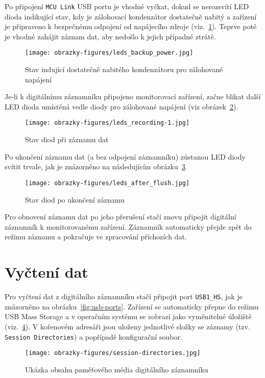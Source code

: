 Po připojení \texttt{MCU Link} USB portu je vhodné vyčkat, dokud se nerozsvítí LED dioda indikující stav, kdy je zálohovací kondenzátor dostatečně nabitý a zařízení je připraveno k bezpečnému odpojení od napájecího zdroje (viz.~\ref{fig:leds-backup-power}). Teprve poté je vhodné zahájit záznam dat, aby nedošlo k jejich případné ztrátě.

\begin{figure}[h]
    \centering
    \texttt{[image: obrazky-figures/leds\_backup\_power.jpg]}
    
    \caption{Stav indující dostatečně nabitého kondenzátoru pro zálohované napájení}
    \label{fig:leds-backup-power}
\end{figure}

Je-li k digitálnímu záznamníku připojeno monitorovací zařízení, začne blikat další LED dioda umístěná vedle diody pro zálohované napájení (viz obrázek~\ref{fig:leds-recording}). 

\begin{figure}[h]
    \centering
    \texttt{[image: obrazky-figures/leds\_recording-1.jpg]}
    
    \caption{Stav diod při záznamu dat}
    \label{fig:leds-recording}
\end{figure}

\newpage

Po ukončení záznamu dat (a bez odpojení záznamníku) zůstanou LED diody svítit trvale, jak je znázorněno na následujícím obrázku~\ref{fig:leds-after-flush}.

\begin{figure}[h]
    \centering
    \texttt{[image: obrazky-figures/leds\_after\_flush.jpg]}
    
    \caption{Stav diod po ukončení záznamu}
    \label{fig:leds-after-flush}
\end{figure}

Pro obnovení záznamu dat po jeho přerušení stačí znovu připojit digitální záznamník k monitorovanému zařízení. Záznamník automaticky přejde zpět do režimu záznamu a pokračuje ve zpracování příchozích dat.

\section{Vyčtení dat}
Pro vyčtení dat z digitálního záznamníku stačí připojit port \texttt{USB1\_HS}, jak je znázorněno na obrázku~\ref{fig:usb-ports}. Zařízení se automaticky přepne do režimu USB Mass Storage a v operačním systému se zobrazí jako vyměnitelné úložiště (viz.~\ref{fig:datalogger-medium}). V kořenovém adresáři jsou uloženy jednotlivé složky se záznamy (tzv. \texttt{Session Directories}) a popřípadě konfigurační soubor.

\begin{figure}[h]
    \centering
    \texttt{[image: obrazky-figures/session-directories.jpg]}
    
    \caption{Ukázka obsahu paměťového média digitálního záznamníku}
    \label{fig:datalogger-medium}
\end{figure}


%
